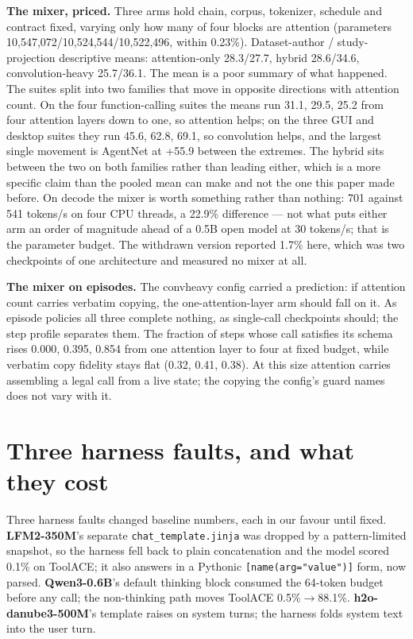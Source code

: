 \documentclass{article}
\begin{document}
\textbf{The mixer, priced.} Three arms hold chain, corpus, tokenizer, schedule and contract fixed, varying only how many of four blocks are attention (parameters 10,547,072/10,524,544/10,522,496, within 0.23\%). Dataset-author / study-projection descriptive means: attention-only 28.3/27.7, hybrid 28.6/34.6, convolution-heavy 25.7/36.1. The mean is a poor summary of what happened. The suites split into two families that move in opposite directions with attention count. On the four function-calling suites the means run 31.1, 29.5, 25.2 from four attention layers down to one, so attention helps; on the three GUI and desktop suites they run 45.6, 62.8, 69.1, so convolution helps, and the largest single movement is AgentNet at +55.9 between the extremes. The hybrid sits between the two on both families rather than leading either, which is a more specific claim than the pooled mean can make and not the one this paper made before. On decode the mixer is worth something rather than nothing: 701 against 541 tokens/s on four CPU threads, a 22.9\% difference --- not what puts either arm an order of magnitude ahead of a 0.5B open model at 30 tokens/s; that is the parameter budget. The withdrawn version reported 1.7\% here, which was two checkpoints of one architecture and measured no mixer at all.


\textbf{The mixer on episodes.} The convheavy config carried a prediction: if attention count carries verbatim copying, the one-attention-layer arm should fall on it. As episode policies all three complete nothing, as single-call checkpoints should; the step profile separates them. The fraction of steps whose call satisfies its schema rises 0.000, 0.395, 0.854 from one attention layer to four at fixed budget, while verbatim copy fidelity stays flat (0.32, 0.41, 0.38). At this size attention carries assembling a legal call from a live state; the copying the config's guard names does not vary with it.
\section{Three harness faults, and what they cost}

Three harness faults changed baseline numbers, each in our favour until fixed.
\textbf{LFM2-350M}'s separate \texttt{chat\_template.jinja} was dropped by a
pattern-limited snapshot, so the harness fell back to plain concatenation and the model scored
0.1\% on ToolACE; it also answers in a Pythonic \texttt{[name(arg="value")]}
form, now parsed. \textbf{Qwen3-0.6B}'s default thinking block consumed the 64-token budget before
any call; the non-thinking path moves ToolACE 0.5\%$\rightarrow$88.1\%. \textbf{h2o-danube3-500M}'s template
raises on system turns; the harness folds system text into the user turn.
\end{document}
